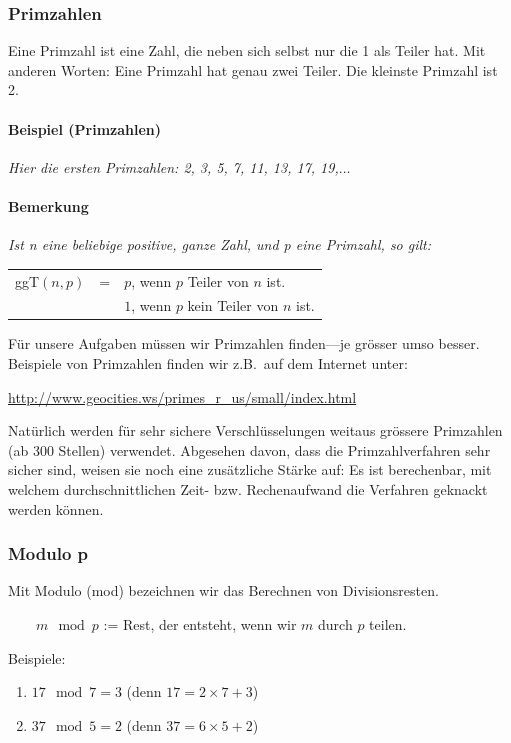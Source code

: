 \subsubsection*{Primzahlen}

Eine Primzahl ist eine Zahl, die neben sich selbst nur die 1 als
Teiler hat. Mit anderen Worten: Eine Primzahl hat genau zwei
Teiler. Die kleinste Primzahl ist 2.

\paragraph*{Beispiel (Primzahlen)}
\emph{Hier die ersten Primzahlen: 2, 3, 5, 7, 11, 13, 17, 19,$\ldots$}

\paragraph*{Bemerkung}
\emph{Ist n eine beliebige positive, ganze Zahl, und p eine Primzahl, so gilt:}

\begin{tabular}{lcl}
    ggT$(n,p)$ & = & $p$, wenn $p$ Teiler von $n$ ist. \\
    & & $1$, wenn $p$ kein Teiler von $n$ ist.
\end{tabular}

Für unsere Aufgaben müssen wir Primzahlen finden---je grösser umso besser.
Beispiele von Primzahlen finden wir z.B.~auf dem Internet unter:

\href{http://www.geocities.ws/primes_r_us/small/index.html}
{http://www.geocities.ws/primes\_r\_us/small/index.html}

Natürlich werden für sehr sichere Verschlüsselungen weitaus grössere
Primzahlen (ab 300 Stellen) verwendet. Abgesehen davon, dass die
Primzahlverfahren sehr sicher sind, weisen sie noch eine zusätzliche
Stärke auf: Es ist berechenbar, mit welchem durchschnittlichen
Zeit- bzw. Rechenaufwand die Verfahren geknackt werden können.

\subsubsection*{Modulo p}

Mit Modulo (mod) bezeichnen wir das Berechnen von Divisionsresten.

$\qquad m \mod p$ := Rest, der entsteht, wenn wir $m$ durch $p$ teilen.

Beispiele:
\begin{enumerate}
    \item $17 \mod 7 = 3$ (denn $17 = 2\times 7 + 3$)
    \item $37 \mod 5 = 2$ (denn $37 = 6\times 5 + 2$)
\end{enumerate}

